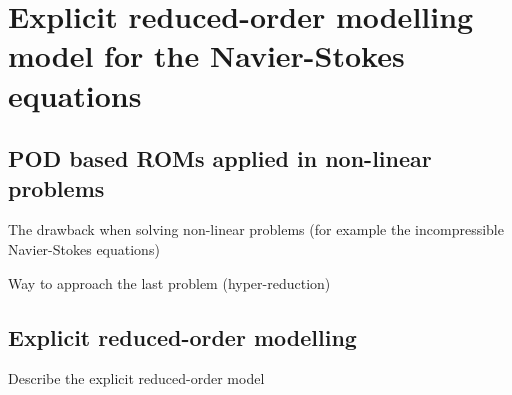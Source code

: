 \documentclass[twoside,11pt]{Latex/Classes/PhDthesisPSnPDF_jacob}
\begin{document}
\section{Explicit reduced-order modelling model for the Navier-Stokes equations}


\subsection{POD based ROMs applied in non-linear problems}

The drawback when solving non-linear problems (for example the incompressible Navier-Stokes equations)

Way to approach the last problem (hyper-reduction)

\subsection{Explicit reduced-order modelling}

Describe the explicit reduced-order model




\ifDebug %
\end{document}
